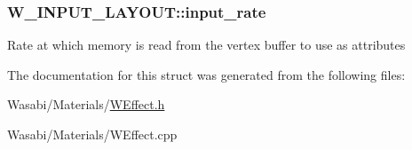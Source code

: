 \subsubsection[{\texorpdfstring{input\+\_\+rate}{input_rate}}]{ W\+\_\+\+I\+N\+P\+U\+T\+\_\+\+L\+A\+Y\+O\+U\+T\+::input\+\_\+rate}\hypertarget{struct_w___i_n_p_u_t___l_a_y_o_u_t_aa02f513ac0db3cbb549d4f5a48bb9fef}{}\label{struct_w___i_n_p_u_t___l_a_y_o_u_t_aa02f513ac0db3cbb549d4f5a48bb9fef}
Rate at which memory is read from the vertex buffer to use as attributes 

The documentation for this struct was generated from the following files\+:\begin{DoxyCompactItemize}
\item 
Wasabi/\+Materials/\hyperlink{_w_effect_8h}{W\+Effect.\+h}\item 
Wasabi/\+Materials/W\+Effect.\+cpp\end{DoxyCompactItemize}

